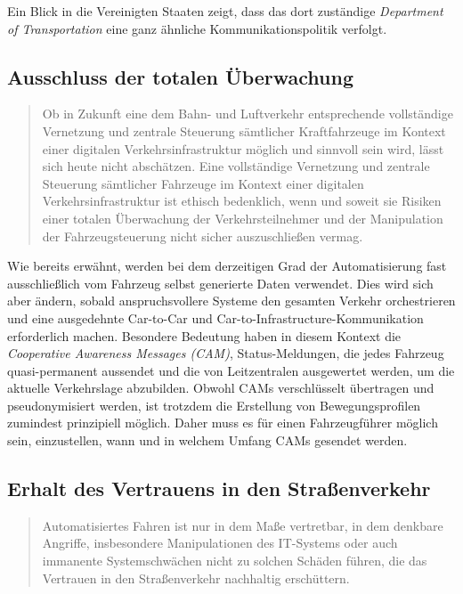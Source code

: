 \documentclass[twoside,a4paper,12pt]{article}
\begin{document}
Ein Blick in die Vereinigten Staaten zeigt, dass das dort zuständige \textit{Department of Transportation} eine ganz ähnliche Kommunikationspolitik
verfolgt.~\cite{dot}\\

\subsection{Ausschluss der totalen Überwachung} \label{AusschlussDerTotalenUeberwachung}

\begin{quote}
\glqq
Ob in Zukunft eine dem Bahn- und Luftverkehr entsprechende vollständige Vernetzung
und zentrale Steuerung sämtlicher Kraftfahrzeuge im Kontext einer digitalen Verkehrsinfrastruktur möglich und sinnvoll sein wird, 
lässt sich heute nicht abschätzen. Eine vollständige Vernetzung und zentrale Steuerung sämtlicher Fahrzeuge im Kontext einer 
digitalen Verkehrsinfrastruktur ist ethisch bedenklich, wenn und soweit sie Risiken einer totalen Überwachung der Verkehrsteilnehmer 
und der Manipulation der Fahrzeugsteuerung nicht sicher auszuschließen vermag.\grqq\mbox{~\cite[S. 12]{ek}}
\end{quote}

Wie bereits erwähnt, werden bei dem derzeitigen Grad der Automatisierung fast ausschließlich vom Fahrzeug selbst generierte Daten verwendet.
Dies wird sich aber ändern, sobald anspruchsvollere Systeme den gesamten Verkehr orchestrieren und eine ausgedehnte Car-to-Car und 
Car-to-Infrastructure-Kommunikation erforderlich machen. Besondere Bedeutung haben in diesem Kontext die \textit{Cooperative Awareness Messages (CAM)},
Status-Meldungen, die jedes Fahrzeug quasi-permanent aussendet und die von Leitzentralen ausgewertet werden, um die aktuelle Verkehrslage abzubilden.
Obwohl CAMs verschlüsselt übertragen und pseudonymisiert werden, ist trotzdem die Erstellung von Bewegungsprofilen zumindest prinzipiell möglich.
Daher muss es für einen Fahrzeugführer möglich sein, einzustellen, wann und in welchem Umfang CAMs gesendet werden.\\

\subsection{Erhalt des Vertrauens in den Straßenverkehr} \label{ErhaltDesVertrauensInDenStrassenverkehr}

\begin{quote}
\glqq
Automatisiertes Fahren ist nur in dem Maße vertretbar, in dem denkbare Angriffe, insbesondere Manipulationen des 
IT-Systems oder auch immanente Systemschwächen nicht
zu solchen Schäden führen, die das Vertrauen in den Straßenverkehr nachhaltig erschüttern.\grqq\mbox{~\cite[S. 12]{ek}}
\end{quote}
\end{document}
